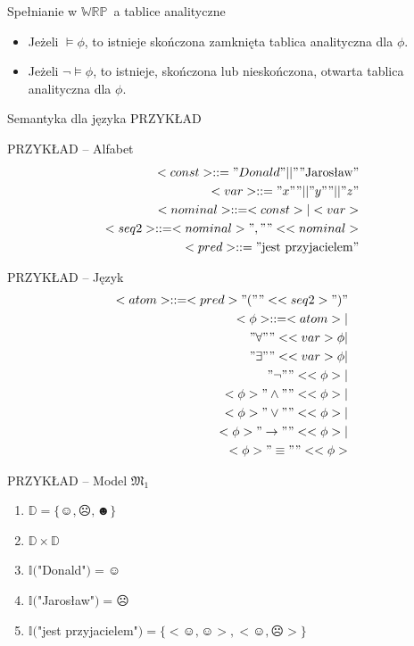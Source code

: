 \documentclass{beamer}
\newcommand {\WRP} {\ensuremath{\mathbb{WRP}}}
\begin{document}
\begin{frame}{Spełnianie w \WRP~a tablice analityczne}
%
\begin{itemize}
    \item Jeżeli $\vDash \phi$, to istnieje skończona zamknięta tablica analityczna dla $\phi$.%
    \item Jeżeli $\neg \vDash \phi$, to istnieje, skończona lub nieskończona, otwarta tablica analityczna dla $\phi$.
\end{itemize}
\end{frame}

\begin{frame}{Semantyka dla języka PRZYKŁAD}
\end{frame}


\begin{frame}{PRZYKŁAD -- Alfabet}
%
\begin{eqnarray}
<const> ::= "Donald" || ""\text{Jarosław}" \\ %
<var> ::= "x"" || "y"" || "z" \\ %
<nominal> ::= <const> | <var> \\ %
<seq2> ::= <nominal>",""<<nominal> \\ %
<pred> ::= "\text{jest przyjacielem}"
\end{eqnarray}
\end{frame}

\begin{frame}{PRZYKŁAD -- Język}
%
\begin{eqnarray}
<atom> ::= <pred>"(""<<seq2>")" \\
%
<\phi> ::= <atom> | \nonumber  \\ 
"\forall""<<var> \phi | \nonumber  \\
"\exists""<<var> \phi | \nonumber  \\
"\neg"" <<\phi> | \nonumber  \\
<\phi> "\land"" <<\phi> | \nonumber \\
<\phi> "\lor"" <<\phi> | \nonumber  \\
<\phi> "\to"" <<\phi> | \nonumber  \\
<\phi> "\equiv"" <<\phi>
\end{eqnarray}
\end{frame}

\begin{frame}{PRZYKŁAD -- Model $\mathfrak{M}_1$}
%
\begin{enumerate}
    \item $\mathbb{D} = \{\smiley{}, \frownie{}, \blacksmiley{} \}$%
    \item $\mathbb{D} \times \mathbb{D}$%
    \item $\mathbb{I}($"Donald"$)=\smiley{}$%
    \item $\mathbb{I}($"Jarosław"$)=\frownie{}$%
    \item $\mathbb{I}($"jest przyjacielem"$)=\{<\smiley{}, \smiley{}>, <\smiley{}, \frownie{}> \}$
\end{enumerate}
\end{frame}
\end{document}
